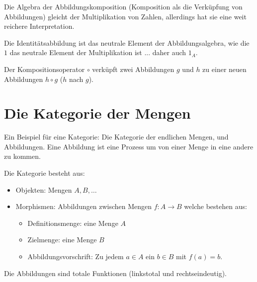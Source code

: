 \documentclass[parskip=half]{scrreprt}
\begin{document}
\begin{remark}
Die Algebra der Abbildungskomposition 
(Komposition als die Verküpfung von Abbildungen)
gleicht der Multiplikation von Zahlen,
allerdings hat sie eine weit reichere Interpretation.
\end{remark}

\begin{remark}
Die Identitätsabbildung ist das neutrale Element der Abbildungsalgebra,
wie die $1$ das neutrale Element der Multiplikation ist ... daher auch $1_A$.
\end{remark}

\begin{remark}
Der Kompositionsoperator $∘$ verküpft zwei Abbildungen $g$ und $h$ zu 
einer neuen Abbildungen $h∘g$ ($h$ nach $g$).
\end{remark}

\chapter{Die Kategorie der Mengen}

Ein Beispiel für eine Kategorie:
Die Kategorie der endlichen Mengen, und Abbildungen.
Eine Abbildung  ist eine Prozess 
um von einer Menge in eine andere zu kommen.

\begin{definition}
Die Kategorie  besteht aus:
\begin{itemize}
\item Objekten: Mengen $A, B, \dots$
\item Morphismen: Abbildungen zwischen Mengen $f: A → B$ welche bestehen aus:
	\begin{itemize}
	\item Definitionsmenge: eine Menge $A$ 
	\item Zielmenge: eine Menge $B$ 
	\item Abbildungsvorschrift: Zu jedem $a ∈ A$ ein $b ∈ B$ mit $f(a) = b$.
	\end{itemize}
\end{itemize}
\end{definition}

\begin{remark}
Die Abbildungen sind totale Funktionen (linkstotal und rechtseindeutig).
\end{remark}
\end{document}
